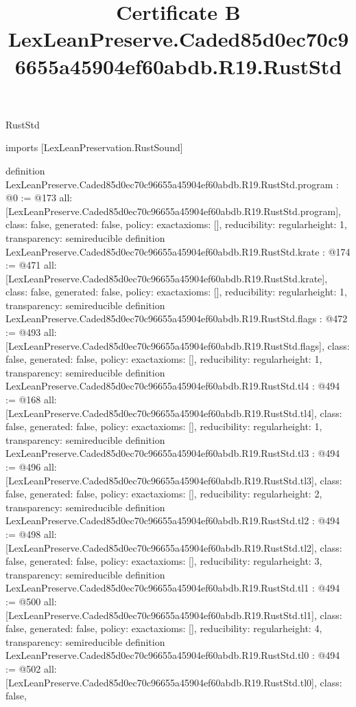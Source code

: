 \begin{lexlean}{RustStd}
\title{Certificate B LexLeanPreserve.Caded85d0ec70c96655a45904ef60abdb.R19.RustStd}
\begin{coremodule}
imports [LexLeanPreservation.RustSound]

definition LexLeanPreserve.Caded85d0ec70c96655a45904ef60abdb.R19.RustStd.program : @0 := @173 {
  all: [LexLeanPreserve.Caded85d0ec70c96655a45904ef60abdb.R19.RustStd.program],
  class: false,
  generated: false,
  policy: exact{axioms: []},
  reducibility: regular{height: 1},
  transparency: semireducible
}
definition LexLeanPreserve.Caded85d0ec70c96655a45904ef60abdb.R19.RustStd.krate : @174 := @471 {
  all: [LexLeanPreserve.Caded85d0ec70c96655a45904ef60abdb.R19.RustStd.krate],
  class: false,
  generated: false,
  policy: exact{axioms: []},
  reducibility: regular{height: 1},
  transparency: semireducible
}
definition LexLeanPreserve.Caded85d0ec70c96655a45904ef60abdb.R19.RustStd.flags : @472 := @493 {
  all: [LexLeanPreserve.Caded85d0ec70c96655a45904ef60abdb.R19.RustStd.flags],
  class: false,
  generated: false,
  policy: exact{axioms: []},
  reducibility: regular{height: 1},
  transparency: semireducible
}
definition LexLeanPreserve.Caded85d0ec70c96655a45904ef60abdb.R19.RustStd.tl4 : @494 := @168 {
  all: [LexLeanPreserve.Caded85d0ec70c96655a45904ef60abdb.R19.RustStd.tl4],
  class: false,
  generated: false,
  policy: exact{axioms: []},
  reducibility: regular{height: 1},
  transparency: semireducible
}
definition LexLeanPreserve.Caded85d0ec70c96655a45904ef60abdb.R19.RustStd.tl3 : @494 := @496 {
  all: [LexLeanPreserve.Caded85d0ec70c96655a45904ef60abdb.R19.RustStd.tl3],
  class: false,
  generated: false,
  policy: exact{axioms: []},
  reducibility: regular{height: 2},
  transparency: semireducible
}
definition LexLeanPreserve.Caded85d0ec70c96655a45904ef60abdb.R19.RustStd.tl2 : @494 := @498 {
  all: [LexLeanPreserve.Caded85d0ec70c96655a45904ef60abdb.R19.RustStd.tl2],
  class: false,
  generated: false,
  policy: exact{axioms: []},
  reducibility: regular{height: 3},
  transparency: semireducible
}
definition LexLeanPreserve.Caded85d0ec70c96655a45904ef60abdb.R19.RustStd.tl1 : @494 := @500 {
  all: [LexLeanPreserve.Caded85d0ec70c96655a45904ef60abdb.R19.RustStd.tl1],
  class: false,
  generated: false,
  policy: exact{axioms: []},
  reducibility: regular{height: 4},
  transparency: semireducible
}
definition LexLeanPreserve.Caded85d0ec70c96655a45904ef60abdb.R19.RustStd.tl0 : @494 := @502 {
  all: [LexLeanPreserve.Caded85d0ec70c96655a45904ef60abdb.R19.RustStd.tl0],
  class: false,
}
\end{coremodule}
\end{lexlean}
